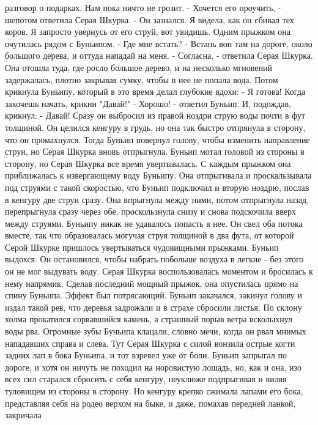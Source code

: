 разговор о подарках. Нам пока ничто не грозит.
    - Хочется его проучить, - шепотом ответила Серая Шкурка. - Он 
зазнался. Я видела, как он сбивал тех коров. Я запросто увернусь от 
его струй, вот увидишь.
    Одним прыжком она очутилась рядом с Буньипом.
    - Где мне встать?
    - Встань вон там на дороге, около большого дерева, и оттуда 
нападай на меня.
    - Согласна, - ответила Серая Шкурка.
    Она отошла туда, где росло большое дерево, и на несколько 
мгновений задержалась, плотно закрывая сумку, чтобы в нее не попала 
вода. Потом крикнула Буньипу, который в это время делал глубокие 
вдохи:
    - Я готова! Когда захочешь начать, крикни "Давай!"
    - Хорошо! - ответил Буньип. И, подождав, крикнул: - Давай!
    Сразу он выбросил из правой ноздри струю воды почти в фут 
толщиной. Он целился кенгуру в грудь, но она так быстро отпрянула в 
сторону, что он промахнулся. Тогда Буньип повернул голову, чтобы 
изменить направление струи, но Серая Шкурка вновь отпрыгнула. Буньип 
мотал головой из стороны в сторону, но Серая Шкурка все время 
увертывалась. С каждым прыжком она приближалась к извергающему воду 
Буньипу. Она отпрыгивала и проскальзывала под струями с такой 
скоростью, что Буньип подключил и вторую ноздрю, послав в кенгуру две 
струи сразу. Она впрыгнула между ними, потом отпрыгнула назад, 
перепрыгнула сразу через обе, проскользнула снизу и снова подскочила 
вверх между струями. Буньипу никак не удавалось попасть в нее. Он свел 
оба потока вместе, так что образовалась могучая струя толщиной в два 
фута, от которой Серой Шкурке пришлось увертываться чудовищными 
прыжками.
    Буньип выдохся. Он остановился, чтобы набрать побольше воздуха в 
легкие - без этого он не мог выдувать воду. Серая Шкурка 
воспользовалась моментом и бросилась к нему напрямик. Сделав последний 
мощный прыжок, она опустилась прямо на спину Буньипа.
    Эффект был потрясающий. Буньип закачался, закинул голову и издал 
такой рев, что деревья задрожали и в страхе сбросили листья. По склону 
холма прокатился сорвавшийся камень, а страшный порыв ветра всколыхнул 
воды рва.
    Огромные зубы Буньипа клацали, словно мечи, когда он рвал мнимых 
нападавших справа и слева. Тут Серая Шкурка с силой вонзила острые 
когти задних лап в бока Буньипа, и тот взревел уже от боли.
    Буньип запрыгал по дороге, и хотя он ничуть не походил на 
норовистую лошадь, но, как и она, изо всех сил старался сбросить с 
себя кенгуру, неуклюже подпрыгивая и виляя туловищем из стороны в 
сторону. Но кенгуру крепко сжимала лапами его бока, представляя себя 
на родео верхом на быке, и даже, помахав передней ланкой, закричала 
